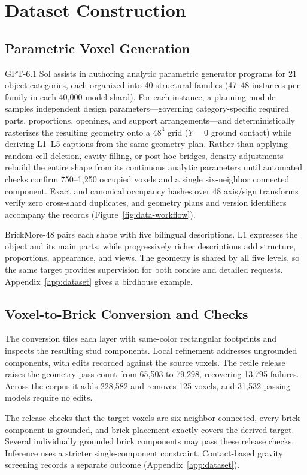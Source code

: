 \documentclass[letterpaper]{article} %
\begin{document}
\section{Dataset Construction}
\label{sec:dataset}
\subsection{Parametric Voxel Generation}
GPT-6.1 Sol assists in authoring analytic parametric generator programs for 21 object categories, each organized into 40 structural families (47--48 instances per family in each 40,000-model shard). For each instance, a planning module samples independent design parameters---governing category-specific required parts, proportions, openings, and support arrangements---and deterministically rasterizes the resulting geometry onto a $48^3$ grid ($Y{=}0$ ground contact) while deriving L1--L5 captions from the same geometry plan. Rather than applying random cell deletion, cavity filling, or post-hoc bridges, density adjustments rebuild the entire shape from its continuous analytic parameters until automated checks confirm 750--1,250 occupied voxels and a single six-neighbor connected component. Exact and canonical occupancy hashes over 48 axis/sign transforms verify zero cross-shard duplicates, and geometry plans and version identifiers accompany the records (Figure~\ref{fig:data-workflow}). %

BrickMore-48 pairs each shape with five bilingual descriptions. L1 expresses the object and its main parts, while progressively richer descriptions add structure, proportions, appearance, and views. The geometry is shared by all five levels, so the same target provides supervision for both concise and detailed requests. Appendix~\ref{app:dataset} gives a birdhouse example.

\subsection{Voxel-to-Brick Conversion and Checks}
The conversion tiles each layer with same-color rectangular footprints and inspects the resulting stud components. Local refinement addresses ungrounded components, %
 with edits recorded against the source voxels. The retile release raises the geometry-pass count from 65,503 to 79,298, recovering 13,795 failures. Across the corpus it adds 228,582 and removes 125 voxels, and 31,532 passing models require no edits.

The release checks that the target voxels are six-neighbor connected, every brick component is grounded, and brick placement exactly covers the derived target. Several individually grounded brick components may pass these release checks. Inference uses a stricter single-component constraint. Contact-based gravity screening records a separate outcome (Appendix~\ref{app:dataset}).
\end{document}
